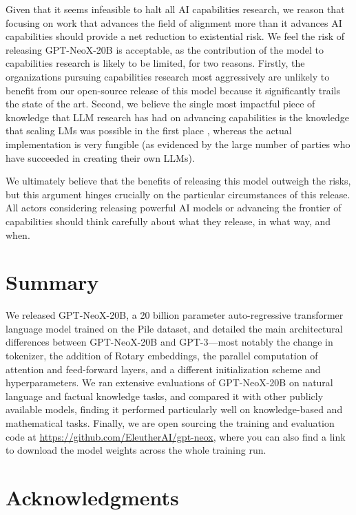 \documentclass{article}
\newcommand{\model}{GPT-NeoX-20B}
\begin{document}
Given that it seems infeasible to halt all AI capabilities research, we reason that focusing on work that advances the field of alignment more than it advances AI capabilities should provide a net reduction to existential risk. We feel the risk of releasing \model{} is acceptable, as the contribution of the model to capabilities research is likely to be limited, for two reasons. Firstly, the organizations pursuing capabilities research most aggressively are unlikely to benefit from our open-source release of this model because it significantly trails the state of the art. Second, we believe the single most impactful piece of knowledge that LLM research has had on advancing capabilities is the knowledge that scaling LMs was possible in the first place \citep{why-release}, whereas the actual implementation is very fungible (as evidenced by the large number of parties who have succeeded in creating their own LLMs).

We ultimately believe that the benefits of releasing this model outweigh the risks, but this argument hinges crucially on the particular circumstances of this release. All actors considering releasing powerful AI models or advancing the frontier of capabilities should think carefully about what they release, in what way, and when. 

\section{Summary}

We released \model{}, a 20 billion parameter auto-regressive transformer language model trained on the Pile \citep{gao2020pile} dataset, and detailed the main architectural differences between \model{} and GPT-3---most notably the change in tokenizer, the addition of Rotary embeddings, the parallel computation of attention and feed-forward layers, and a different initialization scheme and hyperparameters. We ran extensive evaluations of \model{} on natural language and factual knowledge tasks, and compared it with other publicly available models, finding it performed particularly well on knowledge-based and mathematical tasks. Finally, we are open sourcing the training and evaluation code at \url{https://github.com/EleutherAI/gpt-neox}, where you can also find a link to download the model weights across the whole training run.

\section*{Acknowledgments}
\end{document}
